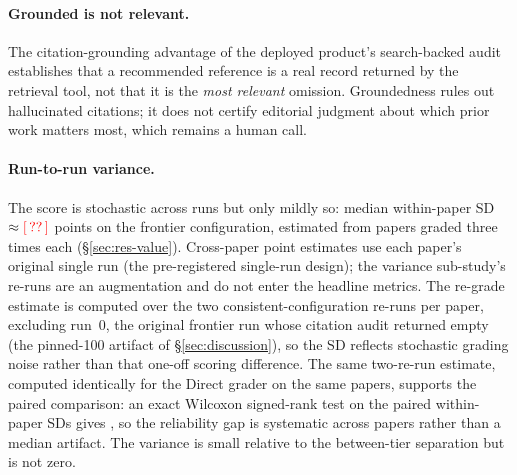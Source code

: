\paragraph{Grounded is not relevant.}
The citation-grounding advantage of the deployed product's search-backed audit
establishes that a recommended reference is a real record returned by the retrieval
tool, not that it is the \emph{most relevant} omission. Groundedness rules out hallucinated
citations; it does not certify editorial judgment about which prior work matters
most, which remains a human call.

\paragraph{Run-to-run variance.}
The score is stochastic across runs but only mildly so: median within-paper SD
$\approx\textcolor{red}{[\,??\,]}$ points on the frontier configuration, estimated from
\runSDnPapers{} papers graded three times each (\S\ref{sec:res-value}). Cross-paper
point estimates use each paper's original single run (the pre-registered
single-run design); the variance sub-study's re-runs are an augmentation and do not
enter the headline metrics. The re-grade estimate is computed over the two
consistent-configuration re-runs per paper, excluding run~0, the original frontier
run whose citation audit returned empty (the pinned-100 artifact of
\S\ref{sec:discussion}), so the SD reflects stochastic grading noise rather than
that one-off scoring difference. The same two-re-run estimate, computed identically
for the Direct grader on the same papers, supports the paired comparison: an exact
Wilcoxon signed-rank test on the \relPairedN{} paired within-paper SDs gives
\relPairedP, so the reliability gap is systematic across papers rather than a
median artifact. The variance is small relative to the between-tier separation but
is not zero.
